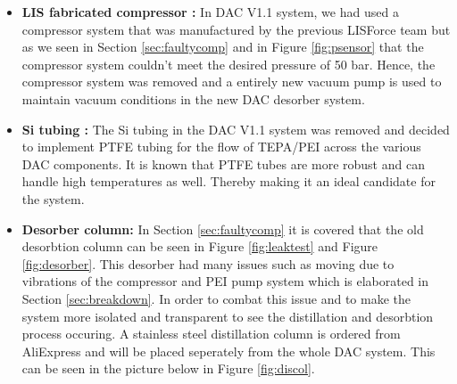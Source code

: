 \begin{itemize}
    \item \textbf{LIS fabricated compressor :} In DAC V1.1 system, we had used a compressor system that was manufactured by the previous LISForce team but as we seen in Section \ref{sec:faultycomp} and in Figure \ref{fig:psensor} that the compressor system couldn't meet the desired pressure of 50 bar. Hence, the compressor system was removed and a entirely new vacuum pump is used to maintain vacuum conditions in the new DAC desorber system. 
    
    \item \textbf{Si tubing :} The Si tubing in the DAC V1.1 system was removed and decided to implement PTFE tubing for the flow of TEPA/PEI across the various DAC components. It is known that PTFE tubes are more robust and can handle high temperatures as well. Thereby making it an ideal candidate for the system. 
    
    \item \textbf{Desorber column:} In Section \ref{sec:faultycomp} it is covered that the old desorbtion column can be seen in Figure \ref{fig:leaktest} and Figure \ref{fig:desorber}. This desorber had many issues such as moving due to vibrations of the compressor and PEI pump system which is elaborated in Section \ref{sec:breakdown}. In order to combat this issue and to make the system more isolated and transparent to see the distillation and desorbtion process occuring. A stainless steel distillation column is ordered from AliExpress and will be placed seperately from the whole DAC system. This can be seen in the picture below in Figure \ref{fig:discol}.
    

\end{itemize}
